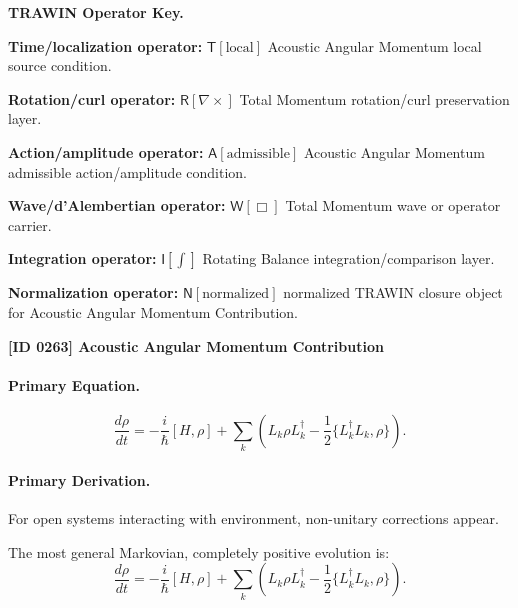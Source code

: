 \par\vspace{0.45\baselineskip}
\noindent\begin{minipage}[t]{\linewidth}
\begingroup
\small
\raggedright
\textbf{TRAWIN Operator Key.}\par
\noindent\textbf{Time/localization operator:} $\mathsf{T}\!\left[\mathrm{local}\right]$ Acoustic Angular Momentum local source condition.\par
\noindent\textbf{Rotation/curl operator:} $\mathsf{R}\!\left[\nabla\times\right]$ Total Momentum rotation/curl preservation layer.\par
\noindent\textbf{Action/amplitude operator:} $\mathsf{A}\!\left[\mathrm{admissible}\right]$ Acoustic Angular Momentum admissible action/amplitude condition.\par
\noindent\textbf{Wave/d'Alembertian operator:} $\mathsf{W}\!\left[\Box\right]$ Total Momentum wave or operator carrier.\par
\noindent\textbf{Integration operator:} $\mathsf{I}\!\left[\int\right]$ Rotating Balance integration/comparison layer.\par
\noindent\textbf{Normalization operator:} $\mathsf{N}\!\left[\mathrm{normalized}\right]$ normalized TRAWIN closure object for Acoustic Angular Momentum Contribution.\par
\endgroup
\end{minipage}

\clearpage
\noindent\textbf{[ID 0263] Acoustic Angular Momentum Contribution}\par
\vspace{0.35em}
\paragraph{Primary Equation.}
\begin{equation}
\frac{d\rho}{dt}
=
-\frac{i}{\hbar}[H,\rho]
+
\sum_k
\left(
L_k \rho L_k^\dagger
-
\frac{1}{2}
\{L_k^\dagger L_k,\rho\}
\right).
\end{equation}

\paragraph{Primary Derivation.}
For open systems interacting with environment, non-unitary corrections appear.

The most general Markovian, completely positive evolution is:
\begin{equation}
\boxed{
\frac{d\rho}{dt}
=
-\frac{i}{\hbar}[H,\rho]
+
\sum_k
\left(
L_k \rho L_k^\dagger
-
\frac{1}{2}
\{L_k^\dagger L_k,\rho\}
\right).
}
\end{equation}

